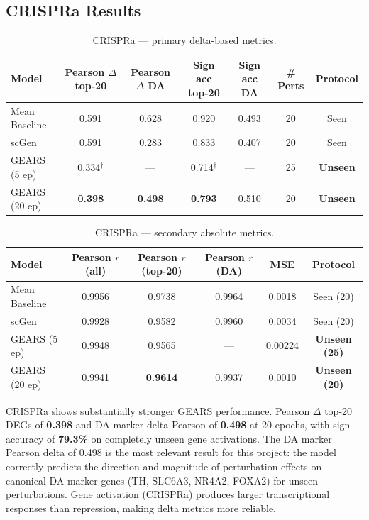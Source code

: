 \documentclass[11pt,letterpaper]{article}
\begin{document}
\subsection{CRISPRa Results}

\begin{table}[h]
\centering
\caption{CRISPRa --- primary delta-based metrics.}
\small
\begin{tabular}{lcccccc}
\toprule
Model & Pearson $\Delta$ top-20 & Pearson $\Delta$ DA & Sign acc top-20 & Sign acc DA & \# Perts & Protocol \\
\midrule
Mean Baseline        & 0.591  & 0.628 & 0.920 & 0.493 & 20 & Seen \\
scGen                & 0.591  & 0.283 & 0.833 & 0.407 & 20 & Seen \\
GEARS (5 ep)         & 0.334$^\dagger$ & --- & 0.714$^\dagger$ & --- & 25 & \textbf{Unseen} \\
GEARS (20 ep)        & \textbf{0.398} & \textbf{0.498} & \textbf{0.793} & 0.510 & 20 & \textbf{Unseen} \\
\bottomrule
\end{tabular}
\end{table}

\begin{table}[h]
\centering
\caption{CRISPRa --- secondary absolute metrics.}
\small
\begin{tabular}{lccccc}
\toprule
Model & Pearson $r$ (all) & Pearson $r$ (top-20) & Pearson $r$ (DA) & MSE & Protocol \\
\midrule
Mean Baseline        & 0.9956 & 0.9738 & 0.9964 & 0.0018  & Seen (20) \\
scGen                & 0.9928 & 0.9582 & 0.9960 & 0.0034  & Seen (20) \\
GEARS (5 ep)         & 0.9948 & 0.9565 & ---    & 0.00224 & \textbf{Unseen (25)} \\
GEARS (20 ep)        & 0.9941 & \textbf{0.9614} & 0.9937 & 0.0010 & \textbf{Unseen (20)} \\
\bottomrule
\end{tabular}
\end{table}

CRISPRa shows substantially stronger GEARS performance. Pearson $\Delta$ top-20 DEGs of
\textbf{0.398} and DA marker delta Pearson of \textbf{0.498} at 20 epochs, with sign accuracy
of \textbf{79.3\%} on completely unseen gene activations. The DA marker Pearson delta of 0.498
is the most relevant result for this project: the model correctly predicts the direction and
magnitude of perturbation effects on canonical DA marker genes (TH, SLC6A3, NR4A2, FOXA2) for
unseen perturbations. Gene activation (CRISPRa) produces larger transcriptional responses than
repression, making delta metrics more reliable.
\end{document}
